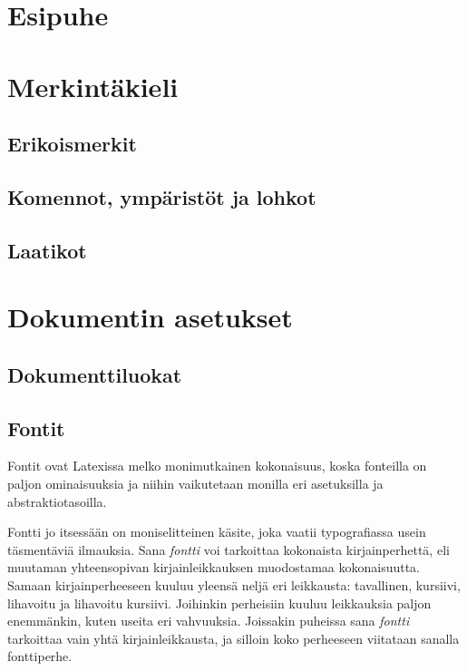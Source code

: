 \documentclass[a4paper,10pt,notitlepage,oneside]{book}
\begin{document}
\pagestyle{empty}


{
  \renewcommand{\thispagestyle}[1]{}
}

\clearpage
\pagestyle{plain}

\chapter*{Esipuhe}





\chapter{Merkintäkieli}
\section{Erikoismerkit}
\section{Komennot, ympäristöt ja lohkot}
\section{Laatikot}

\chapter{Dokumentin asetukset}
\section{Dokumenttiluokat}
\label{luku:dokumenttiluokat}
\section{Fontit}
\label{luku:kirjaintyypit}

Fontit ovat Latexissa melko monimutkainen kokonaisuus, koska fonteilla
on paljon ominaisuuksia ja niihin vaikutetaan monilla eri asetuksilla ja
abstraktiotasoilla.

Fontti jo itsessään on moniselitteinen käsite, joka vaatii
typo\-gra\-fias\-sa usein täsmentäviä ilmauksia. Sana \emph{fontti} voi
tarkoittaa kokonaista kirjainperhettä, eli muutaman yhteensopivan
kirjainleikkauksen muodostamaa kokonaisuutta. Samaan kirjainperheeseen
kuuluu yleensä neljä eri leikkausta: tavallinen, kursiivi, lihavoitu ja
lihavoitu kursiivi. Joihinkin perheisiin kuuluu leikkauksia paljon
enemmänkin, kuten useita eri vahvuuksia. Joissakin puheissa sana
\emph{fontti} tarkoittaa vain yhtä kirjainleikkausta, ja silloin koko
perheeseen viitataan sanalla fonttiperhe.
\end{document}
